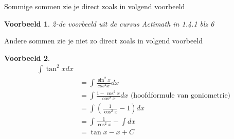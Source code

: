 \documentclass{article}
\newtheorem*{voorbeeld}{Voorbeeld} \newtheorem*{eigenschap}{Eigenschap}
\begin{document}
\noindent Sommige sommen zie je direct zoals in volgend voorbeeld

\begin{voorbeeld} 2-de voorbeeld uit de cursus Actimath in 1.4.1 blz 6
\end{voorbeeld}

\noindent Andere sommen zie je niet zo direct zoals in volgend voorbeeld

\begin{voorbeeld}
\begin{equation*}
\begin{split}
\int \tan ^2 x dx\\
&=\int \frac{\sin^2 x}{cos ^2 x}dx\\
&= \int \frac{1-\cos^2 x}{\cos ^2 x} dx \text { (hoofdformule van goniometrie)}\\
&= \int \left( \frac{1}{\cos^2 x} -1 \right)dx\\
&= \int \frac{1}{\cos ^2 x} - \int dx\\
&= \tan x -x +C\\
\end{split}
\end{equation*}
\end{voorbeeld}
\end{document}
